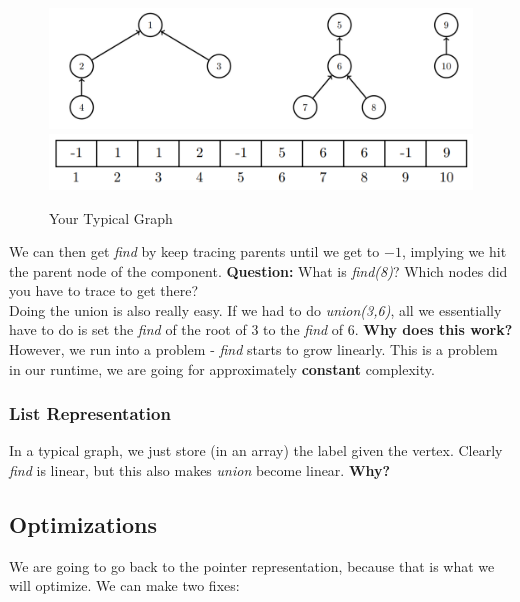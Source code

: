 \documentclass[11pt]{article}
\begin{document}
\begin{figure}[!hb]
    \centering
    \includegraphics[]{images/digraph.png}
    \includegraphics[]{images/pointer.png}
    \caption{Your Typical Graph}
    \label{fig:g1}
\end{figure}
    We can then get \textit{find} by keep tracing parents until we get to $-1$, implying we hit the parent node of the component. \textbf{Question:} What is \textit{find(8)}? Which nodes did you have to trace to get there? \\

    Doing the union is also really easy. If we had to do \textit{union(3,6)}, all we essentially have to do is set the \textit{find} of the root of $3$ to the \textit{find} of $6$. \textbf{Why does this work?} \\
    
    However, we run into a problem - \textit{find} starts to grow linearly. This is a problem in our runtime, we are going for approximately \textbf{constant} complexity. 

\subsubsection{List Representation}
    In a typical graph, we just store (in an array) the label given the vertex. Clearly \textit{find} is linear, but this also makes \textit{union} become linear. \textbf{Why?}
    
\subsection{Optimizations}
    We are going to go back to the pointer representation, because that is what we will optimize. We can make two fixes:
    
\end{document}
